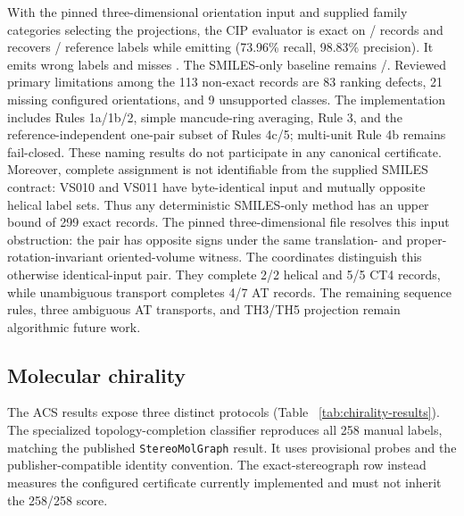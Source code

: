 \documentclass[pdflatex,sn-mathphys-num,referee,lineno]{sn-jnl}
\newcommand{\stereomolgraph}{\texttt{StereoMolGraph}\xspace}
\theoremstyle{plain}
\theoremstyle{remark}
\theoremstyle{definition}
\begin{document}
With the pinned three-dimensional orientation input and supplied family
categories selecting the projections, the CIP evaluator is exact on
\CipCoordinatesExactRecords/\CipCoordinatesRecords{} records and recovers
\CipCoordinatesCorrectLabels/\CipCoordinatesExpectedLabels{} reference labels
while emitting \CipCoordinatesEmittedLabels{} (73.96\% recall, 98.83\%
precision). It emits \CipCoordinatesWrongLabels{} wrong labels and misses
\CipCoordinatesMissingLabels{}. The SMILES-only baseline remains
\CipSmilesExactRecords/\CipSmilesRecords. Reviewed primary limitations among the 113 non-exact
records are 83 ranking defects, 21 missing configured orientations, and 9
unsupported classes.  The implementation includes Rules 1a/1b/2, simple mancude-ring
averaging, Rule 3, and the reference-independent one-pair subset of Rules
4c/5; multi-unit Rule 4b remains fail-closed.  These naming results do not participate
in any canonical certificate.
Moreover, complete assignment is not identifiable from the supplied SMILES contract:
VS010 and VS011 have byte-identical input and mutually opposite helical label
sets.  Thus any deterministic SMILES-only method has an upper bound of
299 exact records.  The pinned three-dimensional file resolves this
input obstruction: the pair has opposite signs under the same
translation- and proper-rotation-invariant oriented-volume witness.
The coordinates distinguish this otherwise identical-input pair. They complete
2/2 helical and 5/5 CT4 records, while unambiguous transport completes 4/7 AT
records. The remaining sequence rules, three ambiguous AT transports, and
TH3/TH5 projection remain algorithmic future work.

\subsection{Molecular chirality}
\label{sec:chirality-results}

The ACS results expose three distinct protocols (Table~
\ref{tab:chirality-results}).  The specialized topology-completion classifier
reproduces all 258 manual labels, matching the published \stereomolgraph result.
It uses provisional probes and the publisher-compatible identity convention.
The exact-stereograph row instead measures the configured certificate currently
implemented and must not inherit the 258/258 score.
\end{document}
